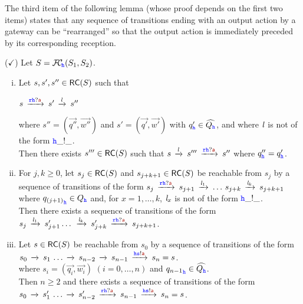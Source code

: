 The third item of the following lemma (whose proof depends on the first two items)
states that any sequence of transitions ending with an output action by a gateway
can be ``rearranged'' so that the output action is immediately preceded
by its corresponding reception. 


\begin{lemma}($\checkmark$)
\label{lem:swap-rolf}
Let $S ={\mathcal{F}\!\mathcal{C}}_{\!{\mathtt{\color{blue}{ {h}}}}}(S_1,S_2)$.

\begin{enumerate}[i)]
\item\label{lem:swap-rolf-item1}
Let $s,s',s''\in \mathsf{RC}(S)$  such that\\
\centerline{
$s\lts{\ttr\HH?\msg[a]}s'\lts{\elle}s''$}
 where $s'' = (\vec{q''},\vec{w''})$ and $s' = (\vec{q'},\vec{w'})$ with  $q'_{\mathtt{\color{blue}{ {h}}}}\in \widehat{Q_{\mathtt{\color{blue}{ {h}}}}}$, and where $\mathit{l}$ is not of the form ${\mathtt{\color{blue}{ {h}}}}\_!\_$.\\
Then there exists $s'''\in \mathsf{RC}(S)$ such that $s\lts{\elle}s'''\lts{\ttr\HH?\msg[a]}s''$
where $q''_{\mathtt{\color{blue}{ {h}}}} = q'_{\mathtt{\color{blue}{ {h}}}}$.

\item\label{lem:swap-rolf-item2}
For $j,k \geq 0$, let $s_j \in \mathsf{RC}(S)$ and $s_{j+k+1} \in \mathsf{RC}(S)$ be reachable from $s_j$ by a sequence of transitions of the form
$s_j  \lts{\ttr\HH?\msg[a]} s_{j+1}\lts{\elle_1}\ldots\, s_{j+k}\lts{\elle_{k}}s_{j+k+1}$
 where ${q_{(j+1)}}_{\mathtt{\color{blue}{ {h}}}}\in Q_{\mathtt{\color{blue}{ {h}}}}$ and, for $x = 1,\ldots,k$,  $\mathit{l}_x$ is not of the form ${\mathtt{\color{blue}{ {h}}}}\_!\_$.\\
Then  there exists a sequence of transitions of the form
\\
\hspace*{30mm}
$s_j  \lts{\elle_1}s'_{j+1} \ldots\,  \lts{\elle_k} s'_{j+k} \lts{\ttr\HH?\msg[a]}s_{j+k+1}$.

\item\label{lem:swap-rolf-item3}
Let $s \in \mathsf{RC}(S)$ be reachable from $s_0$ by a sequence of
transitions of the form\\
\hspace*{30mm}
$s_0\lts{}  s_1\,\ldots \lts{} s_{n-2}  \lts{} s_{n-1}\lts{\HH\tts!\msg[a]}s_n=s$.\\
where $s_i = (\vec{q_i},\vec{w_i})$ $(i=0,\ldots,n)$ and ${q_{n-1}}_{\mathtt{\color{blue}{ {h}}}} \in \widehat{Q_{\mathtt{\color{blue}{ {h}}}}}$.\\
Then $n \geq 2$ and there exists a sequence of transitions of the form
\\
\hspace*{30mm}
$s_0\lts{} s'_1\,\ldots \lts{} s'_{n-2}\lts{\ttr\HH?\msg[a]}s_{n-1}\lts{\HH\tts!\msg[a]}s_n=s$.
\end{enumerate}
\end{lemma}

